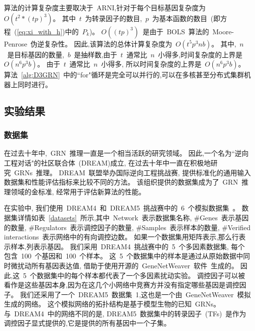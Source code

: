 算法的计算复杂度主要取决于~ARNI,针对于每个目标基因复杂度为~$O(t^2*(tp)^3)$。
其中~$t$~为转录因子的数目,~$p$~为基本函数的数目~(即方程~(\ref{eq:xi_with_h})中的~$P_k$)。
$O((tp)^3)$~是由于~BOLS~算法的~Moore-Penrose~伪逆复杂性。
因此,该算法的总体计算复杂度为~$O(t^5p^3nb)$。
其中,~$n$~是目标基因的数量,~$b$~是抽样数,由于~$t$~通常比~$n$~小得多,时间复杂度的上界是~$O(n^6p^3b)$。
由于~$t$~通常比~$n$~小得多, 所以时间复杂度的上界是~$O(n^6p^3b)$。
算法~\ref{alg:D3GRN}~中的``for"循环是完全可以并行的,可以在多核甚至分布式集群机器上同时进行。


\subsection{实验结果}

\subsubsection{数据集}

在过去十年中,~GRN~推理一直是一个相当活跃的研究领域。
因此,一个名为``逆向工程对话"的社区联合体~(DREAM)\cite{stolovitzky2007dialogue}成立,
在过去十年中一直在积极地研究~GRNs~推理。
DREAM~联盟举办国际逆向工程挑战赛, 提供标准化的通用输入数据集和性能评估指标来比较不同的方法。
该组织提供的数据集成为了~GRN~推理领域的金标准, 经常用于评估新算法的性能。

在实验中,
我们使用~DREAM4~和~DREAM5~挑战赛中的~6~个模拟数据集~\cite{marbach2012wisdom}。
数据集详情如表~\ref{datasets}~所示,其中~Network~表示数据集名称,
\#Genes~表示基因的数量, \#Regulators~表示调控因子的数量, \#Samples~表示样本的数量, 
\#Verified interactions~表示网络中的有向调控边数。
如果一个数据集用矩阵表示,那么行表示样本,列表示基因。
我们采用~DREAM4~挑战赛中的~5~个多因素数据集,
每个包含~100~个基因和~100~个样本。
这~5~个数据集中的样本是通过从原始数据中同时微扰动所有基因表达值, 借助于使用开源的~GeneNetWeaver~软件~\cite{marbach2009generating}生成的。
因此,这~5~个数据集中的每个样本都代表了一个多因素扰动实验。
调控因子可以被看作是这些基因本身,因为在这几个小网络中竞赛方并没有指定哪些基因是调控因子。
我们还采用了一个~DREAM5~数据集~1,这也是一个由~GeneNetWeaver~模拟生成的网络。
这个模拟网络的拓扑结构是基于模型生物的已知~GRNs。
与~DREAM4~中的网络不同的是,
DREAM5~数据集中的转录因子~(TFs)~是作为调控因子显式提供的,它是提供的所有基因中一个子集。


